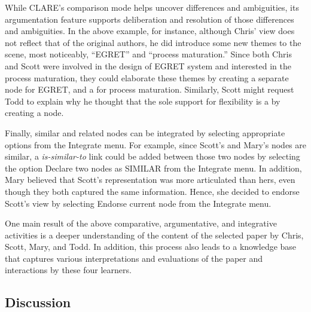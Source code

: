 While CLARE's comparison mode helps uncover differences and ambiguities,
its argumentation feature supports deliberation and resolution of those
differences and ambiguities. In the above example, for instance, although
Chris' view does not reflect that of the original authors, he did introduce
some new themes to the scene, most noticeably, ``EGRET'' and ``process
maturation.'' Since both Chris and Scott were involved in the design of
EGRET system and interested in the process maturation, they could elaborate
these themes by creating a separate  node for EGRET, and
a  for process maturation. Similarly, Scott might
request Todd to explain why he thought that the sole support for
flexibility is a  by creating a 
node.

Finally, similar and related nodes can be integrated by selecting
appropriate options from the {\sf Integrate\/} menu. For example, since
Scott's and Mary's  nodes are similar, a {\it
is-similar-to\/} link could be added between those two nodes by selecting
the option {\sf Declare two nodes as SIMILAR} from the {\sf Integrate}
menu. In addition, Mary believed that Scott's representation was more
articulated than hers, even though they both captured the same
information. Hence, she decided to endorse Scott's view by selecting {\sf
Endorse current node} from the {\sf Integrate} menu.

One main result of the above comparative, argumentative, and integrative
activities is a deeper understanding of the content of the selected paper
by Chris, Scott, Mary, and Todd. In addition, this process also leads to a
knowledge base that captures various interpretations and evaluations of the
paper and interactions by these four learners.


\subsection{Discussion}

